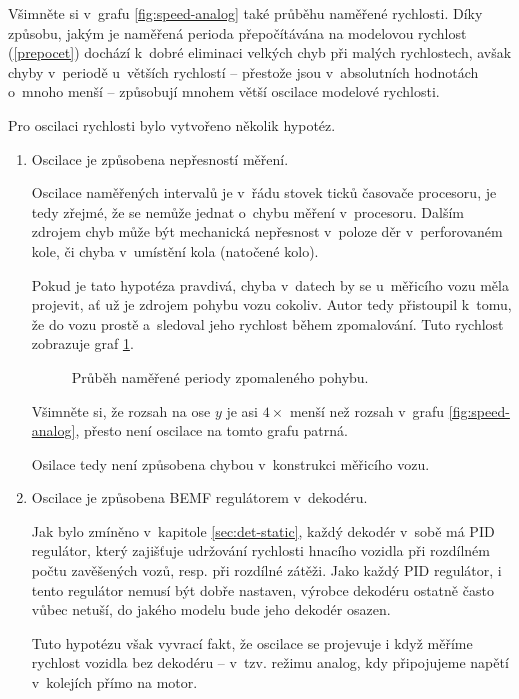 Všimněte si v~grafu \ref{fig:speed-analog} také průběhu naměřené rychlosti.
Díky způsobu, jakým je naměřená perioda přepočítávána na modelovou rychlost
(\ref{prepocet}) dochází k~dobré eliminaci velkých chyb při malých rychlostech,
avšak chyby v~periodě u~větších rychlostí -- přestože jsou v~absolutních
hodnotách o~mnoho menší -- způsobují mnohem větší oscilace modelové rychlosti.

Pro oscilaci rychlosti bylo vytvořeno několik hypotéz.

\begin{enumerate}
\item Oscilace je způsobena nepřesností měření.

Oscilace naměřených intervalů je v~řádu stovek ticků časovače procesoru, je tedy
zřejmé, že se nemůže jednat o~chybu měření v~procesoru. Dalším zdrojem chyb
může být mechanická nepřesnost v~poloze děr v~perforovaném kole, či chyba
v~umístění kola (natočené kolo).

Pokud je tato hypotéza pravdivá, chyba v~datech by se u~měřicího vozu měla
projevit, ať už je zdrojem pohybu vozu cokoliv. Autor tedy přistoupil k~tomu,
že do vozu prostě  a~sledoval jeho rychlost během zpomalování.
Tuto rychlost zobrazuje graf \ref{fig:speed-zduch}.

\begin{figure}[h]

\caption{Průběh naměřené periody zpomaleného pohybu.}
\label{fig:speed-zduch}
\end{figure}

Všimněte si, že rozsah na ose $y$ je asi $4 \times$ menší než rozsah v~grafu
\ref{fig:speed-analog}, přesto není oscilace na tomto grafu patrná.

Osilace tedy není způsobena chybou v~konstrukci měřicího vozu.

\item Oscilace je způsobena BEMF regulátorem v~dekodéru.

Jak bylo zmíněno v~kapitole \ref{sec:det-static}, každý dekodér v~sobě má PID
regulátor, který zajišťuje udržování rychlosti hnacího vozidla při rozdílném
počtu zavěšených vozů, resp. při rozdílné zátěži. Jako každý PID regulátor,
i tento regulátor nemusí být dobře nastaven, výrobce dekodéru ostatně často
vůbec netuší, do jakého modelu bude jeho dekodér osazen.

Tuto hypotézu však vyvrací fakt, že oscilace se projevuje i když měříme rychlost
vozidla bez dekodéru -- v~tzv. režimu analog, kdy připojujeme napětí v~kolejích
přímo na motor.


\end{enumerate}
